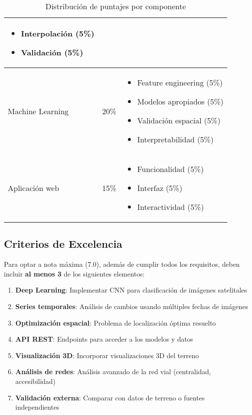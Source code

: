 \documentclass[12pt,a4paper]{article}
\begin{document}
\begin{table}[H]
\begin{tabular}{lcp{7cm}}
\begin{itemize}[leftmargin=*,topsep=0pt,itemsep=0pt]
    \item Interpolación (5\%)
    \item Validación (5\%)
\end{itemize} \\
\midrule
Machine Learning & 20\% &
\begin{itemize}[leftmargin=*,topsep=0pt,itemsep=0pt]
    \item Feature engineering (5\%)
    \item Modelos apropiados (5\%)
    \item Validación espacial (5\%)
    \item Interpretabilidad (5\%)
\end{itemize} \\
\midrule
Aplicación web & 15\% &
\begin{itemize}[leftmargin=*,topsep=0pt,itemsep=0pt]
    \item Funcionalidad (5\%)
    \item Interfaz (5\%)
    \item Interactividad (5\%)
\end{itemize} \\
\bottomrule
\end{tabular}
\caption{Distribución de puntajes por componente}
\end{table}

\subsection{Criterios de Excelencia}

Para optar a nota máxima (7.0), además de cumplir todos los requisitos, deben incluir \textbf{al menos 3} de los siguientes elementos:

\begin{enumerate}
    \item \textbf{Deep Learning}: Implementar CNN para clasificación de imágenes satelitales
    \item \textbf{Series temporales}: Análisis de cambios usando múltiples fechas de imágenes
    \item \textbf{Optimización espacial}: Problema de localización óptima resuelto
    \item \textbf{API REST}: Endpoints para acceder a los modelos y datos
    \item \textbf{Visualización 3D}: Incorporar visualizaciones 3D del terreno
    \item \textbf{Análisis de redes}: Análisis avanzado de la red vial (centralidad, accesibilidad)
    \item \textbf{Validación externa}: Comparar con datos de terreno o fuentes independientes
\end{enumerate}
\end{document}
